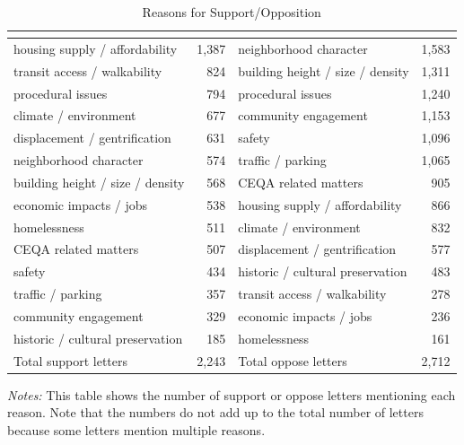
\begin{table}[H]
\caption{Reasons for Support/Opposition}
\vspace{0.2cm}
\label{tab_reasons}
\begin{adjustbox}{max width=\textwidth}
\begin{threeparttable}
\begin{tabular}{lrlr} \toprule
{} &  \\ \midrule
 housing supply / affordability & 1,387 & neighborhood character & 1,583 \\ [1ex]
transit access / walkability & 824 & building height / size / density & 1,311 \\ [1ex]
procedural issues & 794 & procedural issues & 1,240 \\ [1ex]
climate / environment & 677 & community engagement & 1,153 \\ [1ex]
displacement / gentrification & 631 & safety & 1,096 \\ [1ex]
neighborhood character & 574 & traffic / parking & 1,065 \\ [1ex]
building height / size / density & 568 & CEQA related matters & 905 \\ [1ex]
economic impacts / jobs & 538 & housing supply / affordability & 866 \\ [1ex]
homelessness & 511 & climate / environment & 832 \\ [1ex]
CEQA related matters & 507 & displacement / gentrification & 577 \\ [1ex]
safety & 434 & historic / cultural preservation & 483 \\ [1ex]
traffic / parking & 357 & transit access / walkability & 278 \\ [1ex]
community engagement & 329 & economic impacts / jobs & 236 \\ [1ex]
historic / cultural preservation & 185 & homelessness & 161 \\ [1ex]
Total support letters & 2,243 & Total oppose letters & 2,712 \\ [1ex]
\bottomrule
\end{tabular}
\begin{tablenotes}
\item {\textit{Notes: } This table shows the number of support or oppose letters mentioning each reason. Note that the numbers do not add up to the total number of letters because some letters mention multiple reasons.}
\end{tablenotes}
\end{threeparttable}
\end{adjustbox}
\end{table}
